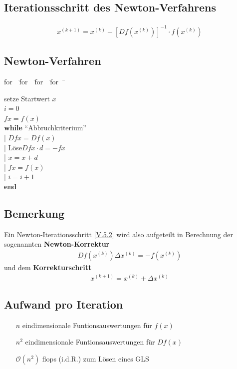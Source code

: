 \documentclass[ngerman,fontsize=11pt, paper=a4, parskip=half, titlepage=true, toc=bib]{scrbook}
\newenvironment{pseudocode}[1]{ %
		\begin{minipage}{#1}
			\begin{framed}
				\hspace*{1em}	
				\begin{minipage}{#1}
					\begin{tabbing}
						for~~\= for~~\= for~~\= for~~\= \kill
	}
	{ %
					\end{tabbing}
				\end{minipage}
				\hspace*{1em}
			\end{framed}
		\end{minipage}
	}
\begin{document}
	\subsection{Iterationsschritt des Newton-Verfahrens}
		\begin{gather}
			x^{(k+1)} = x^{(k)} -[Df(x^{(k)})]^{-1}\cdot f(x^{(k)})
			\label{V.5.2}
		\end{gather}
	
	\subsection{Newton-Verfahren}
	\begin{pseudocode}{0.5\linewidth}
		setze Startwert $x$ \\
		$i=0$ \\
		$fx= f(x)$ \\
		\textbf{while} \enquote{Abbruchkriterium} \\
		|	\> $Dfx = Df(x)$ \\
		|	\> Löse\footnotemark $Dfx\cdot d=-fx$ \\
		|	\> $x=x+d$ \\
		|	\> $fx=f(x)$\\
		|	\> $i=i+1$\\
		\textbf{end}
	\end{pseudocode}
	
	\subsection{Bemerkung}
	Ein Newton-Iterationsschritt \eqref{V.5.2} wird also aufgeteilt in Berechnung
	der sogenannten \textbf{Newton-Korrektur}
	\begin{gather}
		Df(x^{(k)})\Delta x^{(k)} = -f(x^{(k)}) \label{V.5.3}
	\end{gather}
	und dem \textbf{Korrekturschritt}
	\begin{gather}
		x^{(k+1)}= x^{(k)}+\Delta x^{(k)} \label{V.5.4}
	\end{gather}
	
	\subsection{Aufwand pro Iteration}
		\begin{itemize}
			\item[\textbf{$n$}] eindimensionale Funtionsauswertungen für $f(x)$
			\item[\textbf{$n^2$}] eindimensionale Funtionsauswertungen für $Df(x)$
			\item[$\mathcal{O}(n^2)$] flops (i.d.R.) zum Lösen eines GLS
		\end{itemize}
		
\end{document}
